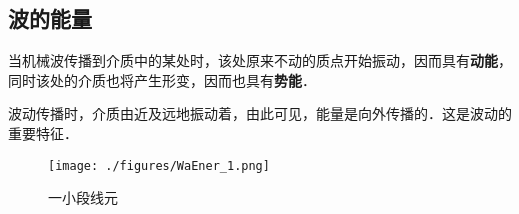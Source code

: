 

\subsection{波的能量}
当机械波传播到介质中的某处时，该处原来不动的质点开始振动，因而具有\textbf{动能}，同时该处的介质也将产生形变，因而也具有\textbf{势能}．

波动传播时，介质由近及远地振动着，由此可见，能量是向外传播的．这是波动的重要特征．

\begin{figure}[ht]
\centering
\texttt{[image: ./figures/WaEner\_1.png]}
\caption{一小段线元} \label{WaEner_fig1}
\end{figure}

